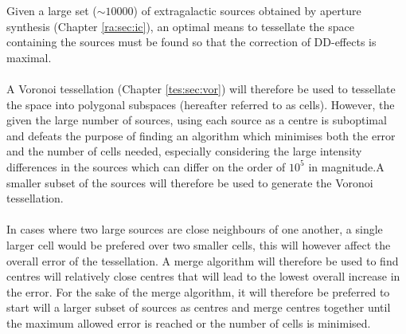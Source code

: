 Given a large set ($\sim10000$) of extragalactic sources obtained by aperture synthesis (Chapter \ref{ra:sec:ic}), an optimal means to tessellate the space containing the sources must be found so that the correction of DD-effects is maximal.
\\
\\
A Voronoi tessellation (Chapter \ref{tes:sec:vor}) will therefore be used to tessellate the space into polygonal subspaces (hereafter referred to as cells). However, the given the large number of sources, using each source as a centre is suboptimal and defeats the purpose of finding an algorithm which minimises both the error and the number of cells needed, especially considering the large intensity differences in the sources which can differ on the order of $10^5$ in magnitude.A smaller subset of the sources will therefore be used to generate the Voronoi tessellation.
\\
\\
In cases where two large sources are close neighbours of one another, a single larger cell would be prefered over two smaller cells, this will however affect the overall error of the tessellation. A merge algorithm will therefore be used to find centres will relatively close centres that will lead to the lowest overall increase in the error. For the sake of the merge algorithm, it will therefore be preferred to start will a larger subset of sources as centres and merge centres together until the maximum allowed error is reached or the number of cells is minimised.